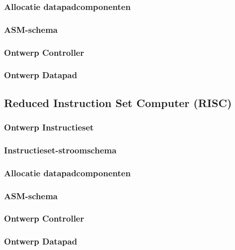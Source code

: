 \subsubsection{Allocatie datapadcomponenten}
\subsubsection{ASM-schema}
\subsubsection{Ontwerp Controller}
\subsubsection{Ontwerp Datapad}
\subsection{Reduced Instruction Set Computer (RISC)}
\subsubsection{Ontwerp Instructieset}
\subsubsection{Instructieset-stroomschema}
\subsubsection{Allocatie datapadcomponenten}
\subsubsection{ASM-schema}
\subsubsection{Ontwerp Controller}
\subsubsection{Ontwerp Datapad}